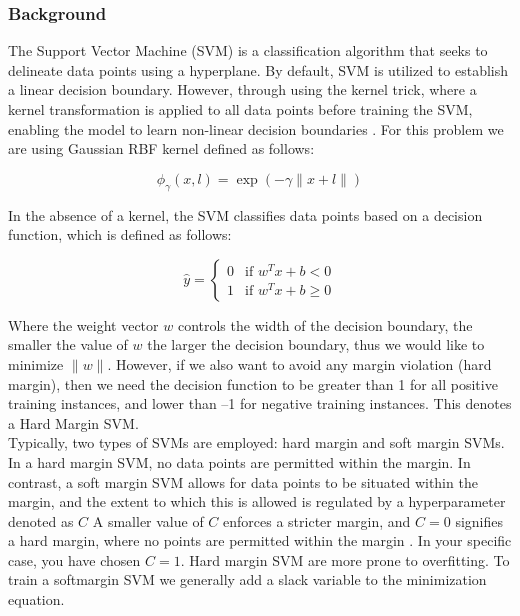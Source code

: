 \documentclass{article}
\begin{document}
\subsubsection{Background}

The Support Vector Machine (SVM) is a classification algorithm that seeks to delineate data points using a hyperplane. By default, SVM is utilized to establish a linear decision boundary. However, through using the kernel trick, where a kernel transformation is applied to all data points before training the SVM, enabling the model to learn non-linear decision boundaries \cite{Geron2019}. For this problem we are using Gaussian RBF kernel defined as follows:

\begin{equation}
    \phi_\gamma(x, l) = \exp (-\gamma \|x + l\|)
\end{equation}

In the absence of a kernel, the SVM classifies data points based on a decision function, which is defined as follows:

\begin{equation}
\hat{y} =
    \begin{cases}
        0 & \text{if } w^Tx + b < 0\\
        1 & \text{if } w^Tx + b \geq 0
    \end{cases}
\end{equation}

Where the weight vector $w$ controls the width of the decision boundary, the smaller the value of $w$ the larger the decision boundary, thus we would like to minimize $\|w\|$. However, if we also want to avoid
any margin violation (hard margin), then we need the decision function to be greater
than 1 for all positive training instances, and lower than –1 for negative training
instances. This denotes a Hard Margin SVM.\\

Typically, two types of SVMs are employed: hard margin and soft margin SVMs. In a hard margin SVM, no data points are permitted within the margin. In contrast, a soft margin SVM allows for data points to be situated within the margin, and the extent to which this is allowed is regulated by a hyperparameter denoted as $C$ A smaller value of $C$ enforces a stricter margin, and $C = 0$ signifies a hard margin, where no points are permitted within the margin \cite{Geron2019}. In your specific case, you have chosen $C = 1$. Hard margin SVM are more prone to overfitting. To train a softmargin SVM we generally add a slack variable to the minimization equation.
\end{document}
